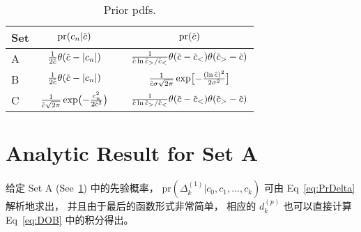\documentclass[12pt]{article}
\newcommand*\dmspr{\textrm{pr}}
\def\dmscbar{\dmsbar{c}}
\def\dmsccck{c_0,c_1,\ldots,c_k}
\def\dmsdeltako{\Delta_k^{(1)}}
\def\dmsdkp{d_k^{(p)}}
\begin{document}
\begin{table}
  \caption{Prior pdfs.}
  \label{tab:1}
  \centering
  \begin{tabular}{lccc}
    \toprule
    Set & $\dmspr(c_n|\dmscbar)$ && $\dmspr(\dmscbar)$ \\
    \hline
    A & $\frac{1}{2\dmscbar}\theta(\dmscbar-|c_n|)$ &\qquad&
    $ \frac{1}{\dmscbar\ln\dmscbar_>/\dmscbar_<}\theta(
    \dmscbar-\dmscbar_<)\theta(\dmscbar_>-\dmscbar)$ \\
    B & $\frac{1}{2\dmscbar}\theta(\dmscbar-|c_n|)$ &&
    $ \frac{1}{\dmscbar\sigma\sqrt{2\pi}}\exp\bigl[
    - \frac{(\ln\dmscbar)^2}{2\sigma^2}\bigr]$ \\
    C & $ \frac{1}{\dmscbar\sqrt{2\pi}}\exp\bigl(
    - \frac{c_n^2}{2\dmscbar^2}\bigr)$ &&
    $ \frac{1}{\dmscbar\ln\dmscbar_>/\dmscbar_<}\theta(
    \dmscbar-\dmscbar_<)\theta(\dmscbar_>-\dmscbar)$ \\
    \bottomrule
  \end{tabular}
\end{table}

\section{Analytic Result for Set A}
给定 Set A (See~\ref{tab:1}) 中的先验概率，
$\dmspr(\dmsdeltako|\dmsccck)$ 可由 Eq~\eqref{eq:PrDelta} 解析地求出，
并且由于最后的函数形式非常简单，
相应的 $\dmsdkp$ 也可以直接计算 Eq~\eqref{eq:DOB} 中的积分得出。
\end{document}
